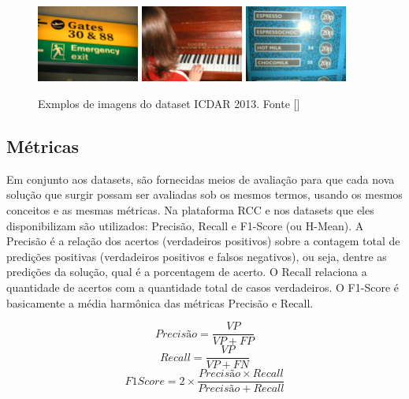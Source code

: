 \begin{figure}
    \centering
    \includegraphics[width=0.3\textwidth]{figs/img_20.jpg}
    \includegraphics[width=0.3\textwidth]{figs/img_85.jpg}
    \includegraphics[width=0.3\textwidth]{figs/img_225.jpg}
    \caption{Exmplos de imagens do dataset ICDAR 2013. Fonte []}
    \label{fig:icdar2013_examples}
\end{figure}

\subsection{Métricas}\label{sec:methodology_metrics}
Em conjunto aos datasets, são fornecidas meios de avaliação para que cada nova solução que surgir possam ser avaliadas sob os mesmos termos, usando os mesmos conceitos e as mesmas métricas. Na plataforma RCC e nos datasets que eles disponibilizam são utilizados: Precisão, Recall e F1-Score (ou H-Mean). A Precisão é a relação dos acertos (verdadeiros positivos) sobre a contagem total de predições positivas (verdadeiros positivos e falsos negativos), ou seja, dentre as predições da solução, qual é a porcentagem de acerto. O Recall relaciona a quantidade de acertos com a quantidade total de casos verdadeiros. O F1-Score é basicamente a média harmônica das métricas Precisão e Recall.

\begin{equation}
    Precisão = \frac{VP}{VP + FP}
\end{equation}
\begin{equation}
    Recall = \frac{VP}{VP + FN}
\end{equation}
\begin{equation}
    F1Score = 2 \times \frac{Precisão \times Recall}{Precisão + Recall}
\end{equation}

